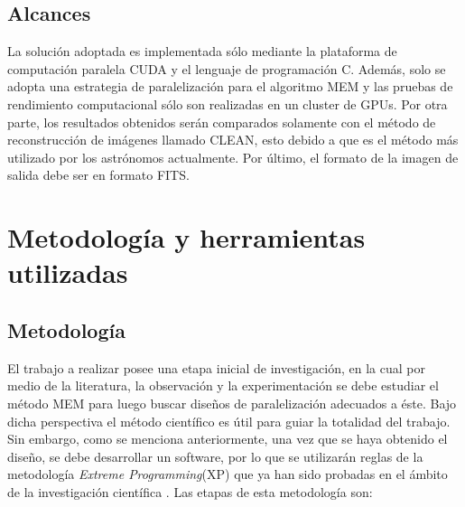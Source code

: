 \subsection{Alcances}
La solución adoptada es implementada sólo mediante la plataforma de computación paralela CUDA y el lenguaje de programación C. Además, solo se adopta una estrategia de paralelización  para el algoritmo MEM y las pruebas de rendimiento computacional sólo son realizadas en un cluster de GPUs. Por otra parte, los resultados obtenidos serán comparados solamente con el método de reconstrucción de imágenes llamado CLEAN, esto debido a que es el método más utilizado por los astrónomos actualmente. Por último, el formato de la imagen de salida debe ser en formato FITS. 


\section{Metodolog\'ia y herramientas utilizadas}
\label{intro:metodologia}

\subsection{Metodolog\'ia}
El trabajo a realizar posee una etapa inicial de investigación, en la cual por medio de la literatura, la observación y la experimentación se debe estudiar el método MEM  para luego buscar diseños de paralelización adecuados a éste. Bajo dicha perspectiva el método científico es útil para guiar la totalidad del trabajo. Sin embargo, como se menciona anteriormente, una vez que se haya obtenido el diseño, se debe desarrollar un software, por lo que se utilizarán reglas de la metodología \textit{Extreme Programming}(XP) que ya han sido probadas en el ámbito de la investigación científica \cite{xp}. Las etapas de esta metodología son:

